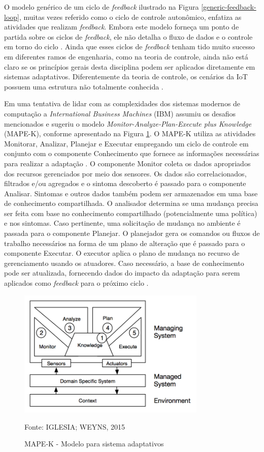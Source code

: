 \documentclass[tid,table]{texufpel} %
\begin{document}
O modelo genérico de um ciclo de \textit{feedback} ilustrado na Figura \ref{generic-feedback-loop}, muitas vezes referido como o ciclo de controle autonômico, enfatiza as atividades que realizam \textit{feedback}. Embora este modelo forneça um ponto de partida sobre os ciclos de \textit{feedback}, ele não detalha o fluxo de dados e o controle em torno do ciclo \cite{dobson06}. Ainda que esses ciclos de \textit{feedback} tenham tido muito sucesso em diferentes ramos de engenharia, como na teoria de controle, ainda não está claro se os princípios gerais desta disciplina podem ser aplicados diretamente em sistemas adaptativos. Diferentemente da teoria de controle, os cenários da IoT possuem uma estrutura não totalmente conhecida \cite{lamprecht12}.


Em uma tentativa de lidar com as complexidades dos sistemas modernos de computação a \textit{International Business Machines} (IBM) assumiu os desafios mencionados e sugeriu o modelo \textit{Monitor-Analyze-Plan-Execute plus Knowledge} (MAPE-K), conforme apresentado na Figura \ref{mape-k-model}. O MAPE-K utiliza as atividades Monitorar, Analizar, Planejar e Executar empregando um ciclo de controle em conjunto com o componente Conhecimento que fornece as informações necessárias para realizar a adaptação \cite{aman15}. O componente Monitor coleta os dados apropriados dos recursos gerenciados por meio dos sensores. Os dados são correlacionados, filtrados e/ou agregados e o sintoma descoberto é passado para o componente Analisar. Sintomas e outros dados também podem ser armazenados em uma base de conhecimento compartilhada. O analisador determina se uma mudança precisa ser feita com base no conhecimento compartilhado (potencialmente uma política) e nos sintomas. Caso pertinente, uma solicitação de mudança no ambiente é passada para o componente Planejar. O planejador gera os comandos ou fluxos de trabalho necessários na forma de um plano de alteração que é passado para o componente Executar. O executor aplica o plano de mudança no recurso de gerenciamento usando os atuadores. Caso necessário, a base de conhecimento pode ser atualizada, fornecendo dados do impacto da adaptação para serem aplicados como \textit{feedback} para o próximo ciclo \cite{lamprecht12}.

\begin{figure}[ht]
\centering
\includegraphics[width=0.8\textwidth]{imagens/mape-k-model.png}
\caption{MAPE-K - Modelo para sistema adaptativos}
\label{mape-k-model}
Fonte: IGLESIA; WEYNS, 2015\nocite{iglesia15}
\end{figure}
\end{document}
